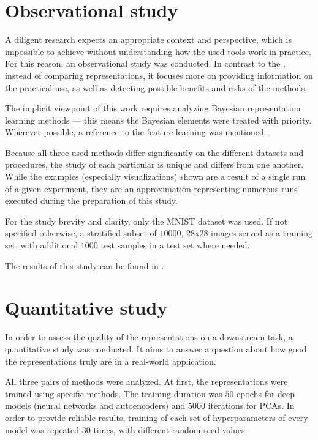 \section{Observational study}
A diligent research expects an appropriate context and perspective, which is impossible to achieve without understanding how the used tools work in practice. For this reason, an observational study was conducted. In contrast to the , instead of comparing representations, it focuses more on providing information on the practical use, as well as detecting possible benefits and risks of the methods.

\vspace{\baselineskip}
The implicit viewpoint of this work requires analyzing Bayesian representation learning methods — this means the Bayesian elements were treated with priority. Wherever possible, a reference to the feature learning was mentioned.

\vspace{\baselineskip}
Because all three used methods differ significantly on the 
different datasets and procedures, the study of each particular is unique and differs from one another. While the examples (especially visualizations) shown are a result of a single run of a given experiment, they are an approximation representing numerous runs executed during the preparation of this study.

\vspace{\baselineskip}
For the study brevity and clarity, only the MNIST dataset was used. If not specified otherwise, a stratified subset of $10000$, $28$x$28$ images served as a training set, with additional $1000$ test samples in a test set where needed.

\vspace{\baselineskip}
The results of this study can be found in .


\section{Quantitative study}\label{sec:quantitative}
In order to assess the quality of the representations on a downstream task, a quantitative study was conducted. It aims to answer a question about how good the representations truly are in a real-world application.

\vspace{\baselineskip}
All three pairs of methods were analyzed. At first, the representations were trained using specific methods. The training duration was $50$ epochs for deep models (neural networks and autoencoders) and $5000$ iterations for PCAs. In order to provide reliable results, training of each set of hyperparameters of every model was repeated $30$ times, with different random seed values.

